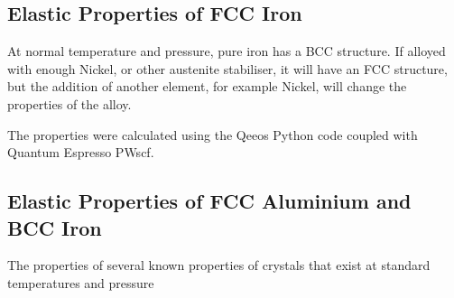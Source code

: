 \subsection{Elastic Properties of FCC Iron}

At normal temperature and pressure, pure iron has a BCC structure.  If alloyed with enough Nickel, or other austenite stabiliser, it will have an FCC structure, but the addition of another element, for example Nickel, will change the properties of the alloy.

The properties were calculated using the Qeeos Python code coupled with Quantum Espresso PWscf.  






\subsection{Elastic Properties of FCC Aluminium and BCC Iron}

The properties of several known properties of crystals that exist at standard temperatures and pressure






